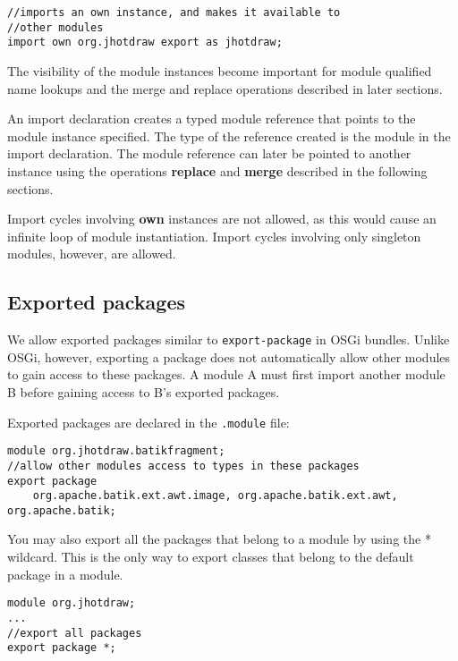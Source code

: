 \begin{lstlisting}
//imports an own instance, and makes it available to
//other modules
import own org.jhotdraw export as jhotdraw;
\end{lstlisting}

The visibility of the module instances become important for module
qualified name lookups and the merge and replace operations described in later
sections.

An import declaration creates a typed module reference that points to the module
instance specified. The type of the reference created is the module
in the import declaration. The module reference can later be pointed to another
instance using the operations \textbf{replace} and \textbf{merge} described
in the following sections.

Import cycles involving \textbf{own} instances are not allowed, as this would 
cause an infinite loop of module instantiation. Import cycles involving only
singleton modules, however, are allowed.

\subsection{Exported packages}

We allow exported packages similar to {\tt export-package} in OSGi bundles. Unlike OSGi, however,
exporting a package does not automatically allow other modules to gain
access to these packages. A module A must first import another module B
before gaining access to B's exported packages.

Exported packages are declared in the {\tt .module} file:

\begin{lstlisting}
module org.jhotdraw.batikfragment;
//allow other modules access to types in these packages
export package 
	org.apache.batik.ext.awt.image,	org.apache.batik.ext.awt,	org.apache.batik;
\end{lstlisting}

You may also export all the packages that belong to a module by using
the * wildcard. This is the only way to export classes that belong to
the default package in a module.

\begin{lstlisting}
module org.jhotdraw;
...
//export all packages
export package *;
\end{lstlisting}


